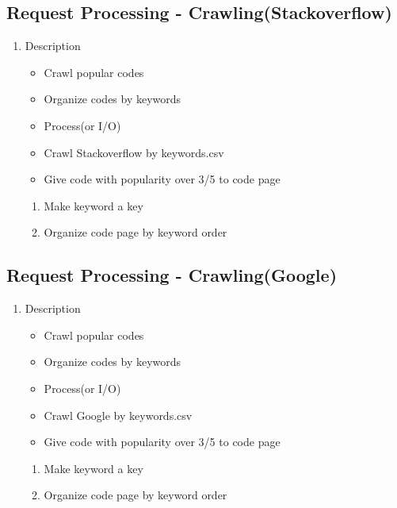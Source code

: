 \documentclass[conference]{IEEEtran}
\begin{document}
\begin{itemize}
\begin{itemize}
\begin{itemize}
\begin{itemize}
\subsection{Request Processing - Crawling(Stackoverflow)}
\begin{enumerate}
\item Description
\begin{itemize}
  \item Crawl popular codes
  \item Organize codes by keywords
  \item Process(or I/O) 
  \item Crawl Stackoverflow by keywords.csv
  \item Give code with popularity over 3/5 to code page
\end{itemize}
\begin{enumerate}
     \item Make keyword a key 
     \item Organize code page by keyword order
  \end{enumerate}
\end{enumerate}
\textit{}

\subsection{Request Processing - Crawling(Google)}
\begin{enumerate}
\item Description

\begin{itemize} 
  \item Crawl popular codes
  \item Organize codes by keywords
  \item Process(or I/O)
  \item Crawl Google by keywords.csv
  \item Give code with popularity over 3/5 to code page
\end{itemize}
  \begin{enumerate}
     \item Make keyword a key 
     \item Organize code page by keyword order
  \end{enumerate}
\end{enumerate}
\textit{}


\end{itemize}
\end{itemize}
\end{itemize}
\end{itemize}
\end{document}
